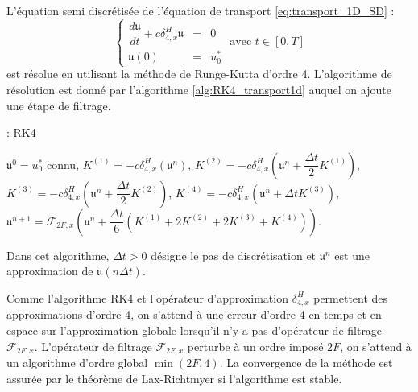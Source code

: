 L'équation semi discrétisée de l'équation de transport \eqref{eq:transport_1D_SD} :
\begin{equation}
\left\lbrace
\begin{array}{rcl}
\dfrac{d \mathfrak{u}}{dt} + c \delta_{4,x}^H \mathfrak{u}& = &0 \\
\mathfrak{u}(0) & = & u_0^*
\end{array}
\text{ avec } t \in [0,T]
\right.
\label{eq:transport_1D_SD}
\end{equation}
est résolue en utilisant la méthode de Runge-Kutta d'ordre 4. L'algorithme de résolution est donné par l'algorithme \ref{alg:RK4_transport1d} auquel on ajoute une étape de filtrage.
\begin{center}
\begin{minipage}[H]{12cm}
  \begin{algorithm}[H]
    \caption{: RK4}\label{alg:RK4_transport1d}
    \begin{algorithmic}[1]
    \State $\mathfrak{u}^0 = u_0^*$ connu,
             \State  $K^{(1)} = - c \delta_{4,x}^H \left( \mathfrak{u}^n \right)$,
             \State  $K^{(2)} = - c \delta_{4,x}^H \left( \mathfrak{u}^n + \dfrac{\Delta t}{2} K^{(1)}\right)$,
             \State  $K^{(3)} = - c \delta_{4,x}^H \left( \mathfrak{u}^n + \dfrac{\Delta t}{2} K^{(2)}\right)$,
             \State  $K^{(4)} = - c \delta_{4,x}^H \left( \mathfrak{u}^n + \Delta t K^{(3)}\right)$,  
             \State  $\mathfrak{u}^{n+1} = \mathcal{F}_{2F,x}\left( \mathfrak{u}^n  + \dfrac{\Delta t}{6} \left( K^{(1)} + 2 K^{(2)} + 2 K^{(3)} + K^{(4)} \right) \right)$.
            \EndFor
    \end{algorithmic}
    \end{algorithm}
\end{minipage}
\end{center}
Dans cet algorithme, $\Delta t > 0$ désigne le pas de discrétisation et $\mathfrak{u}^n$ est une approximation de $\mathfrak{u}(n \Delta t)$.

Comme l'algorithme RK4 et l'opérateur d'approximation $\delta_{4,x}^H$ permettent des approximations d'ordre 4, on s'attend à une erreur d'ordre 4 en temps et en espace sur l'approximation globale lorsqu'il n'y a pas d'opérateur de filtrage $\mathcal{F}_{2F,x}$. L'opérateur de filtrage $\mathcal{F}_{2F,x}$ perturbe à un ordre imposé $2F$, on s'attend à un algorithme d'ordre global $\min(2F,4)$.
La convergence de la méthode est assurée par le théorème de Lax-Richtmyer \cite{Lax1956} si l'algorithme est stable.




